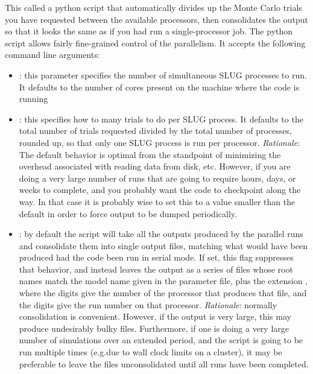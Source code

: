\documentclass[letterpaper,10pt,english]{sphinxmanual}
\begin{document}
This called a python script that automatically divides up the Monte Carlo trials you have requested between the available processors, then consolidates the output so that it looks the same as if you had run a single-processor job. The python script allows fairly fine-grained control of the parallelism. It accepts the following command line arguments:
\begin{itemize}
\item {} 
: this parameter specifies the number of simultaneous SLUG processes to run. It defaults to the number of cores present on the machine where the code is running

\item {} 
: this specifies how to many trials to do per SLUG process. It defaults to the total number of trials requested divided by the total number of processes, rounded up, so that only one SLUG process is run per processor. \emph{Rationale}: The default behavior is optimal from the standpoint of minimizing the overhead associated with reading data from disk, etc. However, if you are doing a very large number of runs that are going to require hours, days, or weeks to complete, and you probably want the code to checkpoint along the way. In that case it is probably wise to set this to a value smaller than the default in order to force output to be dumped periodically.

\item {} 
: by default the  script will take all the outputs produced by the parallel runs and consolidate them into single output files, matching what would have been produced had the code been run in serial mode. If set, this flag suppresses that behavior, and instead leaves the output as a series of files whose root names match the model name given in the parameter file, plus the extension , where the digits  give the number of the processor that produces that file, and the digits  give the run number on that processor. \emph{Rationale}: normally consolidation is convenient. However, if the output is very large, this may produce undesirably bulky files. Furthermore, if one is doing a very large number of simulations over an extended period, and the  script is going to be run multiple times (e.g.due to wall clock limits on a cluster), it may be preferable to leave the files unconsolidated until all runs have been completed.

\end{itemize}
\end{document}

